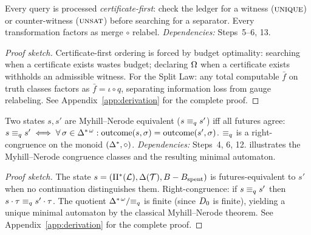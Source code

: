 \begin{theorem}
\label{thm:exactness}
Every query is processed \emph{certificate-first}: check the ledger for a witness ($\textsc{unique}$) or counter-witness ($\textsc{unsat}$) before searching for a separator.  Every transformation factors as merge $\circ$ relabel.
\emph{Dependencies:} Steps~5--6, 13.
\begin{proof}[Proof sketch]
Certificate-first ordering is forced by budget optimality: searching when a certificate exists wastes budget; declaring $\Omega$ when a certificate exists withholds an admissible witness.  For the Split Law: any total computable $\bar{f}$ on truth classes factors as $\bar{f} = \iota \circ q$, separating information loss from gauge relabeling.
See Appendix~\ref{app:derivation} for the complete proof.
\end{proof}
\end{theorem}

\begin{theorem}
\label{thm:myhill-nerode}
Two states $s, s'$ are Myhill--Nerode equivalent ($s \equiv_q s'$) iff all futures agree:
$s \equiv_q s' \iff \forall\, \sigma \in \Delta^{*\,\omega}: \mathrm{outcome}(s, \sigma) = \mathrm{outcome}(s', \sigma)$.
$\equiv_q$ is a right-congruence on the monoid $(\Delta^*, \circ)$.
\emph{Dependencies:} Steps~4, 6, 12.
 illustrates the Myhill--Nerode congruence classes and the resulting minimal automaton.
\begin{proof}[Proof sketch]
The state $s = (\Pi^*(\mathcal{L}), \Delta(\mathcal{T}), B - B_{\mathrm{spent}})$ is futures-equivalent to $s'$ when no continuation distinguishes them.  Right-congruence: if $s \equiv_q s'$ then $s \cdot \tau \equiv_q s' \cdot \tau$.  The quotient $\Delta^{*\,\omega}/{\equiv_q}$ is finite (since $D_0$ is finite), yielding a unique minimal automaton by the classical Myhill--Nerode theorem.
See Appendix~\ref{app:derivation} for the complete proof.
\end{proof}
\end{theorem}

